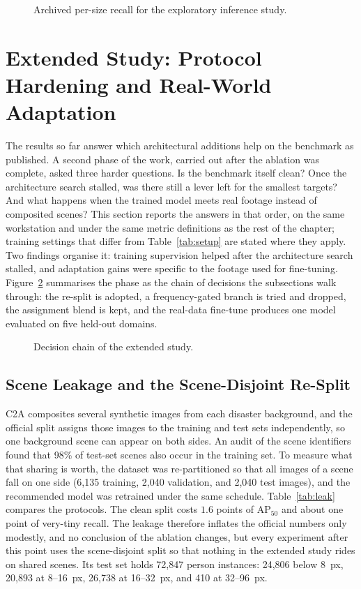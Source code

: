 \begin{figure}[tbp]
  \centering
  \caption{Archived per-size recall for the exploratory inference study.}
  \label{fig:sahibars}
\end{figure}

\section{Extended Study: Protocol Hardening and Real-World Adaptation}
\label{sec:partb}
The results so far answer which architectural additions help on the benchmark
as published. A second phase of the work, carried out after the ablation was
complete, asked three harder questions. Is the benchmark itself clean? Once the
architecture search stalled, was there still a lever left for the smallest
targets? And what happens when the trained model meets real footage instead of
composited scenes? This section reports the answers in that order, on the same
workstation and under the same metric definitions as the rest of the chapter;
training settings that differ from Table~\ref{tab:setup} are stated where they
apply. Two findings organise it: training supervision helped after the
architecture search stalled, and adaptation gains were specific to the footage
used for fine-tuning. Figure~\ref{fig:partbchain} summarises the phase as the chain
of decisions the subsections walk through: the re-split is adopted, a
frequency-gated branch is tried and dropped, the assignment blend is kept,
and the real-data fine-tune produces one model evaluated on five held-out
domains.

\begin{figure}[tbp]
  \centering
  \caption{Decision chain of the extended study.}
  \label{fig:partbchain}
\end{figure}

\subsection{Scene Leakage and the Scene-Disjoint Re-Split}
\label{sec:leak}
C2A composites several synthetic images from each disaster background, and the
official split assigns those images to the training and test sets
independently, so one background scene can appear on both sides. An audit of
the scene identifiers found that 98\% of test-set scenes also occur in the
training set. To measure what that sharing is worth, the dataset was
re-partitioned so that all images of a scene fall on one side (6{,}135
training, 2{,}040 validation, and 2{,}040 test images), and the recommended
model was retrained under the same schedule. Table~\ref{tab:leak} compares the
protocols. The clean split costs $1.6$ points of $\mathrm{AP}_{50}$ and about
one point of very-tiny recall. The leakage therefore inflates the official
numbers only modestly, and no conclusion of the ablation changes, but every
experiment after this point uses the scene-disjoint split so that nothing in
the extended study rides on shared scenes. Its test set holds 72{,}847 person
instances: 24{,}806 below 8~px, 20{,}893 at 8--16~px, 26{,}738 at 16--32~px,
and 410 at 32--96~px.

